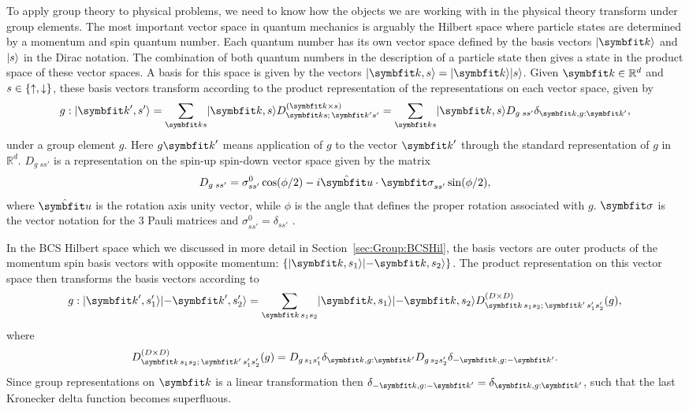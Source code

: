 To apply group theory to physical problems, we need to know how the objects we are working with in the physical theory transform under group elements.
The most important vector space in quantum mechanics is arguably the Hilbert space where particle states are determined by a momentum and spin
quantum number. Each quantum number has its own vector space defined by the basis vectors $\ket{\v{k}}$ and $\lvert s \rangle$ in the Dirac notation. The
combination of both quantum numbers in the description of a particle state then gives a state in the product space of these vector spaces.
A basis for this space is given by the vectors $\ket{\v{k},s} = \ket{\v{k}}\ket{s}$. Given $\v{k}\in\mathbb{R}^d$ and $s\in\{\uparrow,\downarrow\}$,
these basis vectors transform according to the product representation of the representations on each vector space, given by
\begin{equation}
    \label{eq:Group:App}
    g : \ket{\v{k}',s'} = \sum_{\v{k}s}\ket{\v{k},s}D^{(\v{k}\times s)}_{\v{k}s;\,\v{k}'s'} = \sum_{\v{k}s}\ket{\v{k},s}D_{g\;ss'}\delta_{\v{k},g:\v{k}'},
\end{equation}
under a group element $g$. Here $g\v{k}'$ means application of $g$ to the vector $\v{k}'$ through the standard representation of $g$ in $\mathbb{R}^d$.
$D_{g\;ss'}$ is a representation on the spin-up spin-down vector space given by the matrix
\begin{equation}
    \label{eq:Group:Prod:spinRepMatrix}
    D_{g\;ss'} = \sigma^0_{ss'}\cos(\phi/2) - i\hat{\v{u}}\cdot\v{\sigma}_{ss'}\sin(\phi/2),
\end{equation}
where $\hat{\v{u}}$ is the rotation axis unity vector, while $\phi$ is the angle that defines the proper rotation associated with $g$. $\v{\sigma}$ is
the vector notation for the $3$ Pauli matrices and $\sigma^0_{ss'}=\delta_{ss'}$ \cite{Sergi04,Merzbacher99}.

In the BCS Hilbert space which we discussed in more detail in Section~\ref{sec:Group:BCSHil},
the basis vectors are outer products of the momentum spin basis vectors with opposite momentum: $\{\ket{\v{k},s_1}\ket{-\v{k},s_2}\}$. The product
representation on this vector space then transforms the basis vectors according to
\begin{equation}
    \label{eq:Group:Prod:BCSProdRep}
    g:\ket{\v{k}',s_1'}\ket{-\v{k}',s_2'} = \sum_{\v{k}\,s_1s_2}\ket{\v{k},s_1}\ket{-\v{k},s_2}D^{(D\times D)}_{\v{k}\,s_1s_2;\,\v{k}'\,s_1's_2'}(g),
\end{equation}
where
\begin{equation}
    \label{eq:Group:Prod:BCSProdMatrix}
    D^{(D\times D)}_{\v{k}\,s_1s_2;\,\v{k}'\,s_1's_2'}(g) = D_{g\,s_1s_1'}\delta_{\v{k},g:\v{k}'}D_{g\,s_2s_2'}\delta_{-\v{k},g:-\v{k}'}.
\end{equation}
Since group representations on $\v{k}$ is a linear transformation then $\delta_{-\v{k},g:-\v{k}'} = \delta_{\v{k},g:\v{k}'}$, such that the last
Kronecker delta function becomes superfluous.

